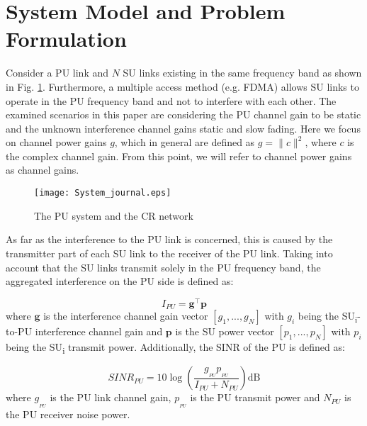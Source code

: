 \documentclass[journal]{IEEEtran}
\begin{document}
\section{System Model and Problem Formulation}

Consider a PU link and $N$ SU links existing in the same frequency band as shown in Fig. \ref{fig1}. Furthermore, a multiple access method (e.g. FDMA) allows SU links to operate in the PU frequency band and not to interfere with each other. The examined scenarios in this paper are considering the PU channel gain to be static and the unknown interference channel gains static and slow fading. Here we focus on channel power gains $g$, which in general are defined as $g=\|c\|^{2}$, where $c$ is the complex channel gain. From this point, we will refer to channel power gains as channel gains.

\begin{figure}[ht!]
\centering
\texttt{[image: System\_journal.eps]}
\caption{The PU system and the CR network}
\label{fig1}
\end{figure}

As far as the interference to the PU link is concerned, this is caused by the transmitter part of each SU link to the receiver of the PU link. Taking into account that the SU links transmit solely in the PU frequency band, the aggregated interference on the PU side is defined as:

\begin{equation}
I_{PU}=\mathbf{g^\intercal}\mathbf{p}
\label{eq1}
\end{equation}
where $\mathbf{g}$ is the interference channel gain vector $[g_{1},...,g_{N}]$ with $g_{i}$ being the SU\textsubscript{i}-to-PU interference channel gain and $\mathbf{p}$ is the SU power vector $[p_{1},...,p_{N}]$ with $p_{i}$ being the SU\textsubscript{i} transmit power. Additionally, the SINR of the PU is defined as:

\begin{equation}
SINR_{PU}=10\log\left(\frac{g_{_{PU}}p_{_{PU}}}{I_{PU}+N_{PU}}\right)\mbox{dB}
\label{eq2}
\end{equation}
where $g_{_{PU}}$ is the PU link channel gain, $p_{_{PU}}$ is the PU transmit power and $N_{PU}$ is the PU receiver noise power.
\end{document}
